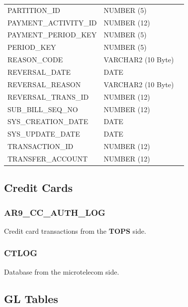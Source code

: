 \documentclass[12pt,twoside]{article}
\begin{document}
\begin{longtable}{lll}
 PARTITION\_ID            &  NUMBER (5)          &                        \\
 PAYMENT\_ACTIVITY\_ID    &  NUMBER (12)         &                        \\
 PAYMENT\_PERIOD\_KEY     &  NUMBER (5)          &                        \\
 PERIOD\_KEY              &  NUMBER (5)          &                        \\
 REASON\_CODE             &  VARCHAR2 (10 Byte)  &                        \\
 REVERSAL\_DATE           &  DATE                &                        \\
 REVERSAL\_REASON         &  VARCHAR2 (10 Byte)  &                        \\
 REVERSAL\_TRANS\_ID      &  NUMBER (12)         &                        \\
 SUB\_BILL\_SEQ\_NO       &  NUMBER (12)         &                        \\
 SYS\_CREATION\_DATE      &  DATE                &                        \\
 SYS\_UPDATE\_DATE        &  DATE                &                        \\
 TRANSACTION\_ID          &  NUMBER (12)         &                        \\
 TRANSFER\_ACCOUNT        &  NUMBER (12)         &                        \\
\hline
\end{longtable}

\normalsize
\subsection{Credit Cards}
\label{sec-11-7}
\subsubsection{AR9\_CC\_AUTH\_LOG}
\label{sec-11-7-1}

    Credit card transactions from the \textbf{TOPS} side.
\subsubsection{CTLOG}
\label{sec-11-7-2}

    Database from the microtelecom side.
\subsection{GL Tables}
\label{sec-11-8}
\end{document}
